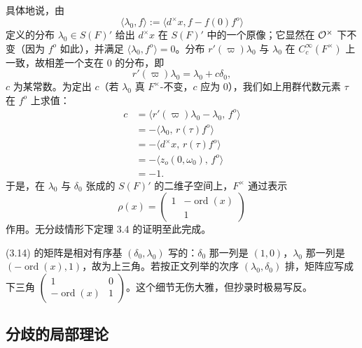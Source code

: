 具体地说，由
\begin{equation*}\tag{3.12}
\langle\lambda_0,f\rangle:=\langle d^\times x,f-f(0)f^o\rangle
\end{equation*}
定义的分布 $\lambda_0\in S(F)'$ 给出 $d^\times x$ 在 $S(F)'$ 中的一个原像；它显然在 $\mathcal{O}^\times$ 下不变（因为 $f^o$ 如此），并满足 $\langle\lambda_0,f^o\rangle=0$。分布 $r'(\varpi)\lambda_0$ 与 $\lambda_0$ 在 $C_c^\infty(F^\times)$ 上一致，故相差一个支在 $0$ 的分布，即
\[
r'(\varpi)\lambda_0=\lambda_0+c\delta_0,
\]
$c$ 为某常数。为定出 $c$（若 $\lambda_0$ 真 $F^\times$-不变，$c$ 应为 $0$），我们如上用群代数元素 $\tau$ 在 $f^o$ 上求值：
\begin{equation*}\tag{3.13}
\begin{aligned}
c&=\langle r'(\varpi)\lambda_0-\lambda_0,\,f^o\rangle\\
&=-\langle\lambda_0,\,r(\tau)f^o\rangle\\
&=-\langle d^\times x,\,r(\tau)f^o\rangle\\
&=-\langle z_o(0,\omega_0),\,f^o\rangle\\
&=-1.
\end{aligned}
\end{equation*}
于是，在 $\lambda_0$ 与 $\delta_0$ 张成的 $S(F)'$ 的二维子空间上，$F^\times$ 通过表示
\begin{equation*}\tag{3.14}
\rho(x)=\begin{pmatrix}1&-\operatorname{ord}(x)\\&1\end{pmatrix}
\end{equation*}
作用。无分歧情形下定理 3.4 的证明至此完成。

\begin{annote}
(3.14) 的矩阵是相对有序基 $(\delta_0,\lambda_0)$ 写的：$\delta_0$ 那一列是 $(1,0)$，$\lambda_0$ 那一列是 $(-\operatorname{ord}(x),1)$，故为上三角。若按正文列举的次序 $(\lambda_0,\delta_0)$ 排，矩阵应写成下三角 $\begin{pmatrix}1&0\\-\operatorname{ord}(x)&1\end{pmatrix}$。这个细节无伤大雅，但抄录时极易写反。
\par\vspace{0.15em}{\raggedleft 【来源：原书 p.~120（PDF 125）算式 (3.14)（A）】\par}
\end{annote}

\subsection*{分歧的局部理论}

